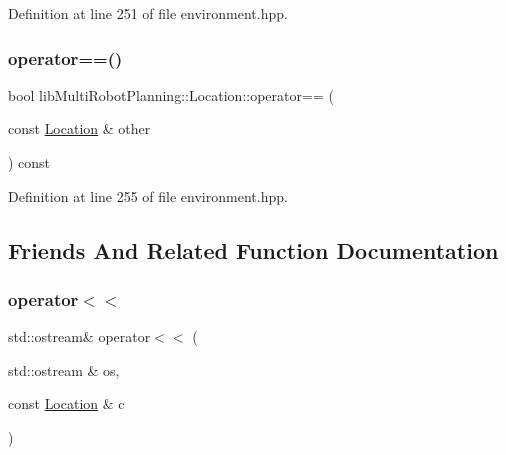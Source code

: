 Definition at line 251 of file environment.\+hpp.

\mbox{\label{structlib_multi_robot_planning_1_1_location_a2f795f653c6e0a2943eff4b8f42fe5fc}} 
\subsubsection{\texorpdfstring{operator==()}{operator==()}}
{\footnotesize\ttfamily bool lib\+Multi\+Robot\+Planning\+::\+Location\+::operator== (\begin{DoxyParamCaption}\item[{const \hyperlink{structlib_multi_robot_planning_1_1_location}{Location} \&}]{other }\end{DoxyParamCaption}) const\hspace{0.3cm}{\ttfamily [inline]}}



Definition at line 255 of file environment.\+hpp.



\subsection{Friends And Related Function Documentation}
\mbox{\label{structlib_multi_robot_planning_1_1_location_a80d23d3abaf3e34d1cb5202feb05f385}} 
\subsubsection{\texorpdfstring{operator$<$$<$}{operator<<}}
{\footnotesize\ttfamily std\+::ostream\& operator$<$$<$ (\begin{DoxyParamCaption}\item[{std\+::ostream \&}]{os,  }\item[{const \hyperlink{structlib_multi_robot_planning_1_1_location}{Location} \&}]{c }\end{DoxyParamCaption})\hspace{0.3cm}{\ttfamily [friend]}}



